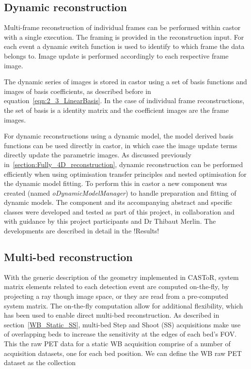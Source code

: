 \subsection{Dynamic reconstruction}
Multi-frame reconstruction of individual frames can be performed within \gls{castor} with a single execution. The framing is provided in the reconstruction input. For each event a dynamic switch function is used to identify to which frame the data belongs to. Image update is performed accordingly to each respective frame image.

The dynamic series of images is stored in \gls{castor} using a set of basis functions and images of basis coefficients, as described before in equation~\ref{eqn:2_3_LinearBasis}. 
In the case of individual frame reconstructions, the set of basis is a identity matrix and the coefficient images are the frame images. 

For dynamic reconstructions using a dynamic model, the model derived basis functions can be used directly in \gls{castor}, in which case the image update terms directly update the parametric images.
As discussed previously in~\autoref{section:Fully_4D_reconstruction}, dynamic reconstruction can be performed efficiently when using optimisation transfer principles and nested optimisation for the dynamic model fitting. 
To perform this in \gls{castor} a new component was created (named \textit{oDynamicModelManager}) to handle preparation and fitting of dynamic models. The component and its accompanying abstract and specific classes were developed and tested as part of this project, in collaboration and with guidance by this project participants and Dr Thibaut Merlin.
The developments are described in detail in the !Results! 

\subsection{Multi-bed reconstruction}
\label{chap2_4:MultiBedRecon}
With the generic description of the geometry implemented in CASToR, system matrix elements related to each detection event are computed on-the-fly, by projecting a ray though image space, or they are read from a pre-computed system matrix. 
The on-the-fly computation allow for additional flexibility, which has been used to enable direct multi-bed reconstruction. 
As described in section~\ref{WB_Static_SS}, multi-bed Step and Shoot (SS) acquisitions make use of overlapping beds to increase the sensitivity at the edges of each bed's FOV. This the raw PET data for a static WB acquisition comprise of a number of acquisition datasets, one for each bed position. We can define the WB raw PET dataset as the collection

